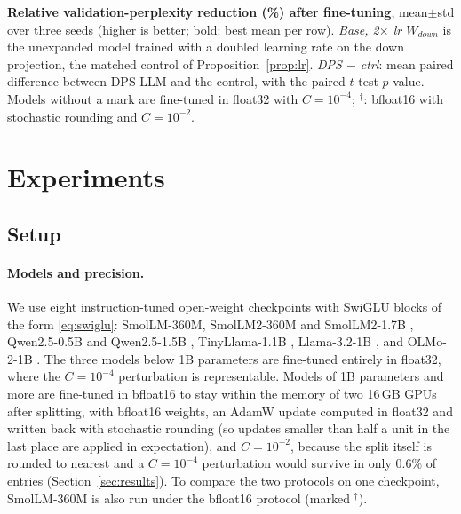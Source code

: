 \begin{table}[t]
\centering
\small
\setlength{\tabcolsep}{3pt}
\caption{\textbf{Relative validation-perplexity reduction (\%) after fine-tuning}, mean{\scriptsize$\pm$std} over three seeds (higher is better; bold: best mean per row). \emph{Base, 2$\times$ lr $W_{down}$} is the unexpanded model trained with a doubled learning rate on the down projection, the matched control of Proposition~\ref{prop:lr}. \emph{DPS $-$ ctrl}: mean paired difference between DPS-LLM and the control, with the paired $t$-test $p$-value. Models without a mark are fine-tuned in float32 with $C{=}10^{-4}$; $^\dagger$: bfloat16 with stochastic rounding and $C{=}10^{-2}$.}
\label{tab:empirical_results}
\vspace{2pt}
\begin{adjustbox}{max width=\textwidth}\end{adjustbox}
\end{table}

\section{Experiments}
\subsection{Setup}
\label{sec:setup}
\paragraph{Models and precision.}
We use eight instruction-tuned open-weight checkpoints with SwiGLU blocks of the form \eqref{eq:swiglu}: SmolLM-360M, SmolLM2-360M and SmolLM2-1.7B \citep{allal2024smollm,allal2025smollm2}, Qwen2.5-0.5B and Qwen2.5-1.5B \citep{qwen2024technical}, TinyLlama-1.1B \citep{zhang2024tinyllama}, Llama-3.2-1B \citep{grattafiori2024llama3}, and OLMo-2-1B \citep{olmo2024olmo2}. The three models below 1B parameters are fine-tuned entirely in float32, where the $C{=}10^{-4}$ perturbation is representable. Models of 1B parameters and more are fine-tuned in bfloat16 to stay within the memory of two 16\,GB GPUs after splitting, with bfloat16 weights, an AdamW update computed in float32 and written back with stochastic rounding \citep{gupta2015deep,zamirai2020revisiting} (so updates smaller than half a unit in the last place are applied in expectation), and $C{=}10^{-2}$, because the split itself is rounded to nearest and a $C{=}10^{-4}$ perturbation would survive in only 0.6\% of entries (Section~\ref{sec:results}). To compare the two protocols on one checkpoint, SmolLM-360M is also run under the bfloat16 protocol (marked $^\dagger$).


